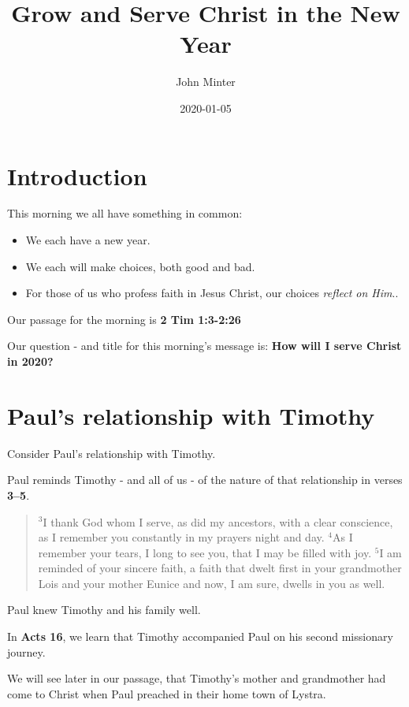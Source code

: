 \documentclass[12pt]{article} %
\title{Grow and Serve Christ in the New Year}
\author{John Minter}
\date{2020-01-05} %
\newcommand{\superscript}[1]{\ensuremath{^{\textrm{#1}}}}
\begin{document}
\maketitle

\section{Introduction}

This morning we all have something in common:

\begin{itemize}
	\item We each have a new year.
	\item We each will make choices, both good and bad.
	\item For those of us who profess faith in Jesus Christ, our choices \emph{reflect on Him}..
\end{itemize}

Our passage for the morning is \textbf{2 Tim 1:3-2:26}

Our question - and title for this morning's message is:
\textbf{How will I serve Christ in 2020?}

\section{Paul's relationship with Timothy}

Consider Paul's relationship with Timothy.

Paul reminds Timothy - and all of us - of the nature of that relationship in
verses \textbf{3--5}.

\begin{quote}
\superscript{3}I thank God whom I serve, as did my ancestors, with a clear
conscience, as I remember you constantly in my prayers night and day.
\superscript{4}As I remember your tears, I long to see you, that I may be
filled with joy. \superscript{5}I am reminded of your sincere faith, a faith
that dwelt first in your grandmother Lois and your mother Eunice and now,
I am sure, dwells in you as well.
\end{quote}

Paul knew Timothy and his family well.

In \textbf{Acts 16}, we learn that Timothy accompanied Paul on his second
missionary journey.

We will see later in our passage, that Timothy's mother and grandmother had
come to Christ when Paul preached in their home town of Lystra.
\end{document}
